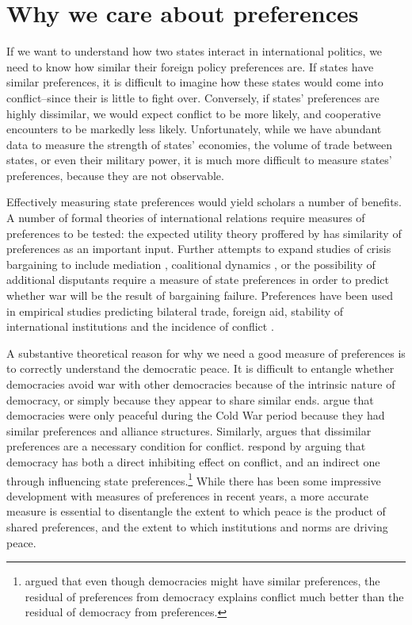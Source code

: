 \section*{Why we care about preferences}

If we want to understand how two states interact in international politics, we need to know how similar their foreign policy preferences are. If states have similar preferences, it is difficult to imagine how these states would come into conflict--since their is little to fight over. Conversely, if states' preferences are highly dissimilar, we would expect conflict to be more likely, and cooperative encounters to be markedly less likely. Unfortunately, while we have abundant data to measure the strength of states' economies, the volume of trade between states, or even their military power, it is much more difficult to measure states' preferences, because they are not observable.

Effectively measuring state preferences would yield scholars a number of benefits. A number of formal theories of international relations require measures of preferences to be tested: the expected utility theory proffered by \citep{buenodemesquita:1983} has similarity of preferences as an important input. Further attempts to expand studies of crisis bargaining to include mediation \citep{kydd:2003}, coalitional dynamics \citep{wolford:2014}, or the possibility of additional disputants \citep{gallop:2017} require a measure of state preferences in order to predict whether war will be the result of bargaining failure. Preferences have been used in empirical studies predicting bilateral trade, foreign aid, stability of international institutions and the incidence of conflict \citep{derouen:heo:2004, stone:2004, gartzke:2007, kastner:2007, braumoeller:2008}. 

A substantive theoretical reason for why we need a good measure of preferences is to correctly understand the democratic peace. It is difficult to entangle whether democracies avoid war with other democracies because of the intrinsic nature of democracy, or simply because they appear to share similar ends. \citet{farber:gowa:1995} argue that democracies were only peaceful during the Cold War period because they had similar preferences and alliance structures. Similarly, \citet{gartzke:1998} argues that dissimilar preferences are a necessary condition for conflict. \citet{oneal:russett:1999e} respond by arguing that democracy has both a direct inhibiting effect on conflict, and an indirect one through influencing state preferences.\footnote{\citet{gartzke:2000} argued that even though democracies might have similar preferences, the residual of preferences from democracy explains conflict much better than the residual of democracy from preferences.} While there has been some impressive development with measures of preferences in recent years, a more accurate measure is essential to disentangle the extent to which peace is the product of shared preferences, and the extent to which institutions and norms are driving peace.

